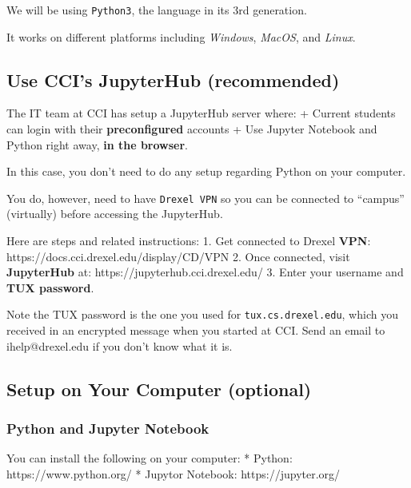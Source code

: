 \documentclass[
  letterpaper,
]{scrbook}
\begin{document}

We will be using \texttt{Python3}, the language in its 3rd generation.

It works on different platforms including \emph{Windows}, \emph{MacOS},
and \emph{Linux}.

\subsection*{Use CCI's JupyterHub
(recommended)}\label{use-ccis-jupyterhub-recommended}

The IT team at CCI has setup a JupyterHub server where: + Current
students can login with their \textbf{preconfigured} accounts + Use
Jupyter Notebook and Python right away, \textbf{in the browser}.

In this case, you don't need to do any setup regarding Python on your
computer.

You do, however, need to have \texttt{Drexel\ VPN} so you can be
connected to ``campus'' (virtually) before accessing the JupyterHub.

Here are steps and related instructions: 1. Get connected to Drexel
\textbf{VPN}: https://docs.cci.drexel.edu/display/CD/VPN 2. Once
connected, visit \textbf{JupyterHub} at:
https://jupyterhub.cci.drexel.edu/ 3. Enter your username and
\textbf{TUX password}.

Note the TUX password is the one you used for
\texttt{tux.cs.drexel.edu}, which you received in an encrypted message
when you started at CCI. Send an email to ihelp@drexel.edu if you don't
know what it is.

\subsection*{Setup on Your Computer
(optional)}\label{setup-on-your-computer-optional}

\subsubsection*{Python and Jupyter
Notebook}\label{python-and-jupyter-notebook}

You can install the following on your computer: * Python:
https://www.python.org/ * Jupytor Notebook: https://jupyter.org/
\end{document}
